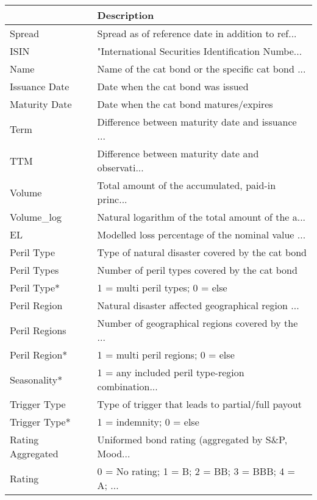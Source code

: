 \begin{tabular}{ll}
\toprule
{} &                                        Description \\
\midrule
Spread              &  Spread as of reference date in addition to ref... \\
ISIN                &  "International Securities Identification Numbe... \\
Name                &  Name of the cat bond or the specific cat bond ... \\
Issuance Date       &                  Date when the cat bond was issued \\
Maturity Date       &             Date when the cat bond matures/expires \\
Term                &  Difference between maturity date and issuance ... \\
TTM                 &  Difference between maturity date and observati... \\
Volume              &  Total amount of the accumulated, paid-in princ... \\
Volume\_log          &  Natural logarithm of the total amount of the a... \\
EL                  &  Modelled loss percentage of the nominal value ... \\
Peril Type          &   Type of natural disaster covered by the cat bond \\
Peril Types         &      Number of peril types covered by the cat bond \\
Peril Type*         &                    1 = multi peril types; 0 = else \\
Peril Region        &  Natural disaster affected geographical region ... \\
Peril Regions       &  Number of geographical regions covered by the ... \\
Peril Region*       &                  1 = multi peril regions; 0 = else \\
Seasonality*        &  1 = any included peril type-region combination... \\
Trigger Type        &  Type of trigger that leads to partial/full payout \\
Trigger Type*       &                            1 = indemnity; 0 = else \\
Rating Aggregated   &  Uniformed bond rating (aggregated by S\&P, Mood... \\
Rating              &  0 = No rating; 1 = B; 2 = BB; 3 = BBB; 4 = A; ... \\

\end{tabular}
